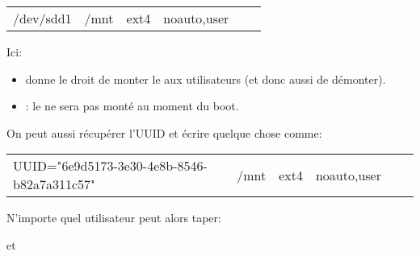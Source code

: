 {\ttfamily
\begin{tabular}{llllll}
  /dev/sdd1 & /mnt & ext4 & noauto,user \\
\end{tabular}
}
Ici:
\begin{itemize}
  \item {} donne le droit de monter le \sff{} aux
    utilisateurs (et donc aussi de démonter).
  \item {}: le \sff{} ne sera pas monté au moment du boot.
\end{itemize}

On peut aussi  récupérer l'UUID et écrire quelque chose comme:

{\ttfamily
\begin{tabular}{llllll}
UUID="6e9d5173-3e30-4e8b-8546-b82a7a311c57" & /mnt & ext4 &
noauto,user \\
\end{tabular}
}\medskip

N'importe quel utilisateur peut alors taper:


et

